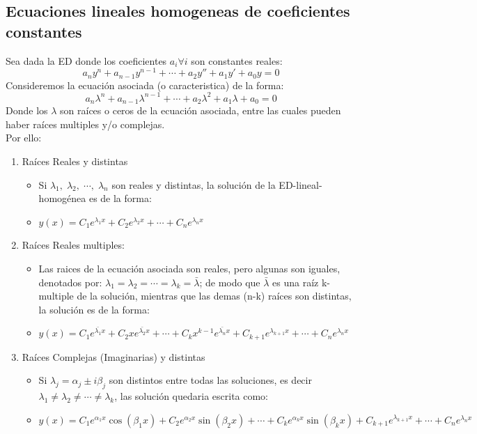 \documentclass[10pt]{article}
\begin{document}
\subsection{Ecuaciones lineales homogeneas de coeficientes constantes}
Sea dada la ED donde los coeficientes \(\displaystyle a_{i}\forall i\) son constantes reales:
\[a_{n}y^{n}+a_{n-1}y^{n-1}+\cdots+a_{2}y''+a_{1}y'+a_{0}y=0\]
Consideremos la ecuación asociada (o caracteristica) de la forma:
\[a_{n}\lambda^{n}+a_{n-1}\lambda^{n-1}+\cdots+a_{2}\lambda^{2}+a_{1}\lambda+a_{0}=0\]
Donde los \(\displaystyle \lambda\) son raíces o ceros de la ecuación asociada, entre las cuales pueden haber raíces multiples y/o complejas.\\
Por ello:
\begin{enumerate}
  \item Raíces Reales y distintas
  \begin{itemize}
    \item Si \(\displaystyle \lambda_{1},\;\lambda_{2},\;\cdots,\;\lambda_{n}\) son reales y distintas, la solución de la ED-lineal-homogénea es de la forma:
    \item \(\displaystyle y(x)=C_{1}e^{\lambda_{1}x}+C_{2}e^{\lambda_{2}x}+\cdots+C_{n}e^{\lambda_{n}x}\)
  \end{itemize}
  \item Raíces Reales multiples:
  \begin{itemize}
    \item Las raices de la ecuación asociada son reales, pero algunas son iguales, denotados por: \(\displaystyle \lambda_{1}=\lambda_{2}=\cdots=\lambda_{k}=\bar{\lambda}\); de modo que \(\displaystyle \bar{\lambda}\) es una raíz k-multiple de la solución, mientras que las demas (n-k) raíces son distintas, la solución es de la forma:
    \item \(\displaystyle y(x)=C_{1}e^{\bar{\lambda_{1}}x}+C_{2}xe^{\bar{\lambda_{2}}x}+\cdots+C_{k}x^{k-1}e^{\bar{\lambda_{n}}x}+C_{k+1}e^{\lambda_{k+1}x}+\cdots+C_{n}e^{\lambda_{n}x}\)
  \end{itemize}
  \item Raíces Complejas (Imaginarias) y distintas
  \begin{itemize}
    \item Si \(\displaystyle \lambda_{j}=\alpha_{j}\pm i\beta_{j}\) son distintos entre todas las soluciones, es decir  \(\displaystyle\lambda_{1}\neq\lambda_{2}\neq\cdots\neq\lambda_{k}\), las solución quedaria escrita como:
    \item \(\displaystyle y(x)=C_{1}e^{\alpha_{1}x}\cos\left(\beta_{1}x\right)+C_{2}e^{\alpha_{2}x}\sin\left(\beta_{2}x\right) + \cdots + C_{k}e^{\alpha_{k}x}\sin\left(\beta_{k}x\right)+C_{k+1}e^{\lambda_{k+1}x}+\cdots+C_{n}e^{\lambda_{n}x}\)

\end{itemize}
\end{enumerate}
\end{document}

